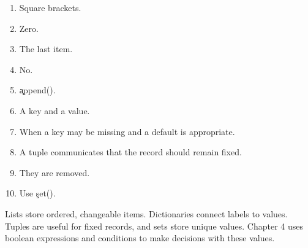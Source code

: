 
\begin{enumerate}
    \item Square brackets.
    \item Zero.
    \item The last item.
    \item No.
    \item \c{append()}.
    \item A key and a value.
    \item When a key may be missing and a default is appropriate.
    \item A tuple communicates that the record should remain fixed.
    \item They are removed.
    \item Use \c{set()}.
\end{enumerate}

\begin{tcolorbox}[title=Chapter summary,colframe=orange,colback=white,arc=2mm]
Lists store ordered, changeable items. Dictionaries connect labels to values.
Tuples are useful for fixed records, and sets store unique values. Chapter 4
uses boolean expressions and conditions to make decisions with these values.
\end{tcolorbox}

